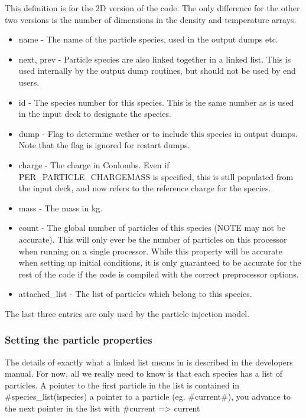 This definition is for the 2D version of the code. The only difference for
the other two versions is the number of dimensions in the density and
temperature arrays.

\begin{itemize}
\item name - The name of the particle species, used in the output dumps etc.
\item next, prev - Particle species are also linked together in a linked
  list. This is used internally by the output dump routines, but should not be
  used by end users.
\item id - The species number for this species. This is the same number as is
  used in the input deck to designate the species.
\item dump - Flag to determine wether or to include this species in output
  dumps. Note that the flag is ignored for restart dumps.
\item charge - The charge in Coulombs. Even if PER\_PARTICLE\_CHARGEMASS is
  specified, this is still populated from the input deck, and now refers to
  the reference charge for the species.
\item mass - The mass in kg.
\item count - The global number of particles of this species (NOTE may not
  be accurate). This will only ever be the number of particles on this
  processor when running on a single processor. While this property will be
  accurate when setting up initial conditions, it is only guaranteed to be
  accurate for the rest of the code if the code is compiled with the correct
  preprocessor options.
\item attached\_list - The list of particles which belong to this species.
\end{itemize}

The last three entries are only used by the particle injection model.

\subsubsection{Setting the particle properties}
The details of exactly what a linked list means in {\EPOCH} is described
in the developers manual. For now, all we really need to know is that each
species has a list of particles. A pointer to the first particle in the list
is contained in #species_list(ispecies)%
a pointer to a particle (eg. #current#), you advance to the next pointer in
the list with #current => current%

